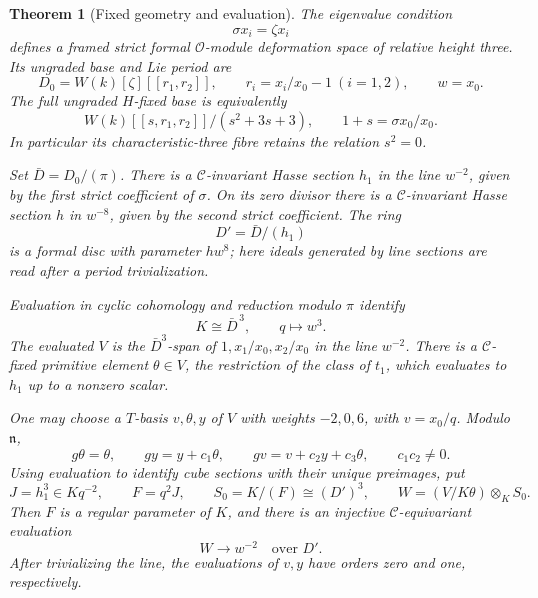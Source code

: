 \documentclass[11pt]{article}
\newtheorem{theorem}{Theorem}[section]
\theoremstyle{definition}
\theoremstyle{remark}
\numberwithin{equation}{section}
\begin{document}
\begin{theorem}[Fixed geometry and evaluation]\label{coef:fixed-geometry}
The eigenvalue condition
\[
 \sigma x_i=\zeta x_i
\]
defines a framed strict formal \(\mathcal O\)-module deformation space of
relative height three.  Its ungraded base and Lie period are
\[
 D_0=W(k)[\zeta][[r_1,r_2]],\qquad
 r_i=x_i/x_0-1\ (i=1,2),\qquad w=x_0.
\]
The full ungraded \(H\)-fixed base is equivalently
\begin{equation}\label{coef:nonreduced-fixed}
 W(k)[[s,r_1,r_2]]/(s^2+3s+3),\qquad 1+s=\sigma x_0/x_0.
\end{equation}
In particular its characteristic-three fibre retains the relation
\(s^2=0\).

Set \(\bar D=D_0/(\pi)\).  There is a
\(\mathcal C\)-invariant Hasse section \(h_1\) in the line \(w^{-2}\),
given by the first strict coefficient of \(\sigma\).
On its zero divisor there is a \(\mathcal C\)-invariant Hasse section
\(h\) in \(w^{-8}\), given by the second strict coefficient.
The ring
\[
 D'=\bar D/(h_1)
\]
is a formal disc with parameter \(hw^8\); here ideals generated by
line sections are read after a period trivialization.

Evaluation in cyclic cohomology and reduction modulo \(\pi\) identify
\[
 K\cong\bar D^{\,3},\qquad q\longmapsto w^3.
\]
The evaluated \(V\) is the \(\bar D^3\)-span of
\(1,x_1/x_0,x_2/x_0\) in the line \(w^{-2}\).
There is a \(\mathcal C\)-fixed primitive element
\(\theta\in V\), the restriction of the class of \(t_1\), which
evaluates to \(h_1\) up to a nonzero scalar.

One may choose a \(T\)-basis \(v,\theta,y\) of \(V\) with weights
\(-2,0,6\), with \(v=x_0/q\).  Modulo \(\mathfrak n\),
\begin{equation}\label{coef:jordan}
 g\theta=\theta,\qquad
 gy=y+c_1\theta,\qquad
 gv=v+c_2y+c_3\theta,\qquad c_1c_2\ne0.
\end{equation}
Using evaluation to identify cube sections with their unique
preimages, put
\[
 J=h_1^3\in Kq^{-2},\qquad F=q^2J,\qquad
 S_0=K/(F)\cong(D')^3,\qquad
 W=(V/K\theta)\otimes_K S_0.
\]
Then \(F\) is a regular parameter of \(K\), and there is an injective
\(\mathcal C\)-equivariant evaluation
\[
 W\longrightarrow w^{-2}\quad\text{over }D'.
\]
After trivializing the line, the evaluations of \(v,y\) have
orders zero and one, respectively.
\end{theorem}
\end{document}
